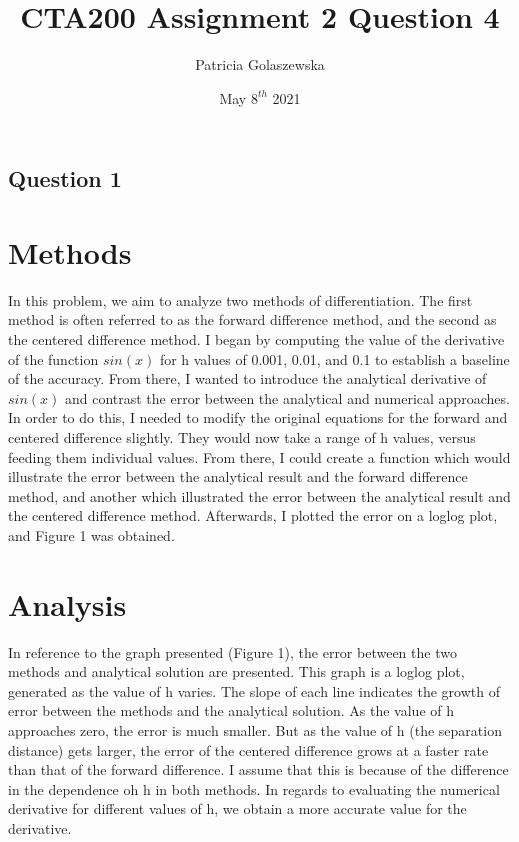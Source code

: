 \documentclass{article}
\title{CTA200 Assignment 2 Question 4}
\author{Patricia Golaszewska}
\date{May $8^{th}$ 2021}
\begin{document}
\maketitle

\newpage

\begin{center}
    \section*{Question 1}
\end{center}

\section*{Methods}

In this problem, we aim to analyze two methods of differentiation. The first method is often referred to as the forward difference method, and the second as the centered difference method. I began by computing the value of the derivative of the function $sin(x)$ for h values of 0.001, 0.01, and 0.1 to establish a baseline of the accuracy. From there, I wanted to introduce the analytical derivative of $sin(x)$ and contrast the error between the analytical and numerical approaches. In order to do this, I needed to modify the original equations for the forward and centered difference slightly. They would now take a range of h values, versus feeding them individual values. From there, I could create a function which would illustrate the error between the analytical result and the forward difference method, and another which illustrated the error between the analytical result and the centered difference method. Afterwards, I plotted the error on a loglog plot, and Figure 1 was obtained. 


\section*{Analysis}

In reference to the graph presented (Figure 1), the error between the two methods and analytical solution are presented. This graph is a loglog plot, generated as the value of h varies. The slope of each line indicates the growth of error between the methods and the analytical solution. As the value of h approaches zero, the error is much smaller. But as the value of h (the separation distance) gets larger, the error of the centered difference grows at a faster rate than that of the forward difference. I assume that this is because of the difference in the dependence oh h in both methods. In regards to evaluating the numerical derivative for different values of h, we obtain a more accurate value for the derivative.   
\end{document}
